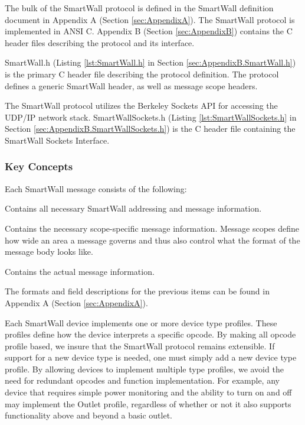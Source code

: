 \documentclass[12pt]{article}
\begin{document}
The bulk of the SmartWall protocol is defined in the SmartWall
definition document in Appendix A (Section \ref{sec:AppendixA}). The
SmartWall protocol is implemented in ANSI C. Appendix B (Section
\ref{sec:AppendixB}) contains the C header files describing the protocol
and its interface.

SmartWall.h (Listing
\ref{lst:SmartWall.h} in Section \ref{sec:AppendixB.SmartWall.h}) is
the primary C header file describing the protocol definition. The
protocol defines a generic SmartWall header, as well as message scope
headers.

The SmartWall protocol utilizes the Berkeley Sockets API for accessing
the UDP/IP network stack. SmartWallSockets.h (Listing
\ref{lst:SmartWallSockets.h} in Section
\ref{sec:AppendixB.SmartWallSockets.h}) is the C header file containing
the SmartWall Sockets Interface.

\subsubsection{Key Concepts}

Each SmartWall message consists of the following:
\begin{description}
  \setlength{\itemsep}{0pt}
  \setlength{\parskip}{0pt}
  \setlength{\parsep}{0pt}
\item[SmartWall Message Header:] Contains all necessary SmartWall
  addressing and message information.
\item[SmartWall Scope Header:] Contains the necessary scope-specific
  message information. Message scopes define how wide an area a
  message governs and thus also control what the format of the message
  body looks like.
\item[SmartWall Message Body:] Contains the actual message information.
\end{description}

The formats and field descriptions for the previous items can be found
in Appendix A (Section \ref{sec:AppendixA}).

Each SmartWall device implements one or more device
type profiles. These profiles define how the device interprets a
specific opcode. By making all opcode profile based, we insure that
the SmartWall protocol remains extensible. If support for a new device
type is needed, one must simply add a new device type profile. By
allowing devices to implement multiple type profiles, we avoid the need
for redundant opcodes and function implementation. For example, any
device that requires simple power monitoring and the ability to turn
on and off may implement the Outlet profile, regardless of whether or not
it also supports functionality above and beyond a basic outlet.
\end{document}
